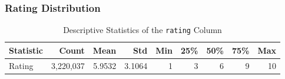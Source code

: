 \subsubsection*{Rating Distribution}
\begin{table}[H]
  \centering
  \caption{Descriptive Statistics of the \texttt{rating} Column}
  \label{tab:rating-stats}
  \begin{tabular}{@{}lrrrrrrrr@{}}
    \toprule
    Statistic & Count        & Mean   & Std    & Min & 25\% & 50\% & 75\% & Max \\ 
    \midrule
    Rating    & 3{,}220{,}037 & 5.9532 & 3.1064 & 1   & 3    & 6    & 9    & 10  \\
    \bottomrule
  \end{tabular}
\end{table}

